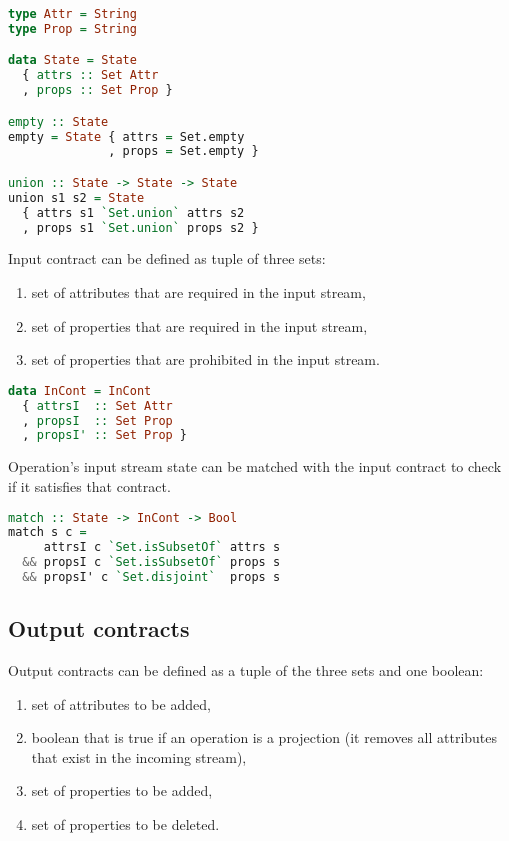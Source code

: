\begin{lstlisting}[language=Haskell]
type Attr = String
type Prop = String

data State = State
  { attrs :: Set Attr
  , props :: Set Prop }

empty :: State
empty = State { attrs = Set.empty
              , props = Set.empty }

union :: State -> State -> State
union s1 s2 = State
  { attrs s1 `Set.union` attrs s2
  , props s1 `Set.union` props s2 }
\end{lstlisting}

Input contract can be defined as tuple of three sets:
\begin{enumerate}
    \item set of attributes that are required in the input stream,
    \item set of properties that are required in the input stream,
    \item set of properties that are prohibited in the input stream.
\end{enumerate}

\begin{lstlisting}[language=Haskell]
data InCont = InCont
  { attrsI  :: Set Attr
  , propsI  :: Set Prop
  , propsI' :: Set Prop }
\end{lstlisting}

Operation's input stream state can be matched with the input contract to check if it satisfies that contract.

\begin{lstlisting}[language=Haskell]
match :: State -> InCont -> Bool
match s c =
     attrsI c `Set.isSubsetOf` attrs s
  && propsI c `Set.isSubsetOf` props s
  && propsI' c `Set.disjoint`  props s
\end{lstlisting}

\subsection{Output contracts}

Output contracts can be defined as a tuple of the three sets and one boolean:
\begin{enumerate}
    \item set of attributes to be added,
    \item boolean that is true if an operation is a projection (it removes all attributes that exist in the incoming stream),
    \item set of properties to be added,
    \item set of properties to be deleted.
\end{enumerate}

